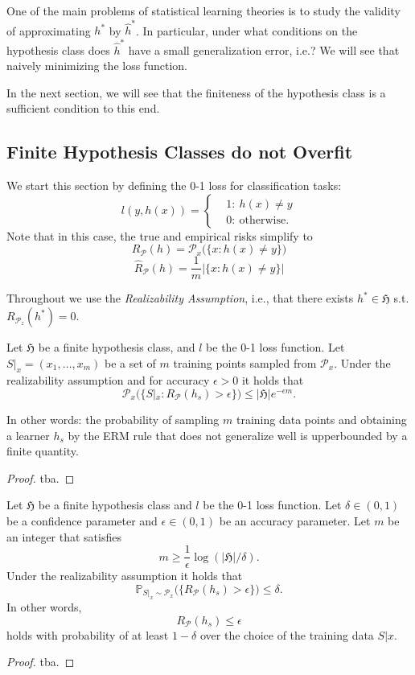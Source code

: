 One of the main problems of statistical learning theories is to study the
validity of approximating $h^*$ by $\hat{h}^*$. In particular, under what
conditions on the hypothesis class does $\hat{h}^*$ have a small generalization error,
i.e.? We
will see that naively minimizing the loss function. 

In the next section, we will see that the finiteness of the hypothesis class is
a sufficient condition to this end. 

\subsection{Finite Hypothesis Classes do not Overfit}
We start this section by defining the 0-1 loss for classification tasks:
\begin{equation*}
    l(y, h(x)) =
    \begin{cases}
         & 1: \ h(x) \neq y \\
        & 0: \ \text{otherwise}.
    \end{cases}	
\end{equation*}
Note that in this case, the true and empirical risks simplify to
$$
R_{\mathcal{P}}(h) = \mathcal{P}_x \bigl(\{x: h(x) \neq y\} \bigr)
$$
$$
\hat{R}_{\mathcal{P}}(h) = \frac{1}{m} | \{x: h(x) \neq y\} |
$$

Throughout we use the 
 \emph{Realizability Assumption}, i.e., that
there exists $h^* \in \mathfrak{H}$ s.t. $R_{\mathcal{P}_z}(h^*) = 0$.

    \begin{lemma}
		Let $\mathfrak{H}$ be a finite hypothesis class, and $l$ be the 0-1 loss
		function. Let $S|_x = (x_1, \dots, x_m)$ be a set of $m$ training points
		sampled from $\mathcal{P}_x$. Under the realizability assumption and
		for accuracy $\epsilon >0$ it holds that 
		$$
		\mathcal{P}_x\bigl(\{S|_x: R_\mathcal{P}(h_s) > \epsilon\} \bigr) \leq |\mathfrak{H}| e ^{-\epsilon m}.
		$$
	\end{lemma}
	In other words: the probability of sampling $m$ training data points and
	obtaining a learner $h_s$ by the ERM rule that does not generalize well is
	upperbounded by a finite quantity.
\begin{proof}
    tba.
\end{proof}
    \begin{coro}
		\label{Coro:finite_hypo}
		Let $\mathfrak{H}$ be a finite hypothesis class and $l$ be the 0-1 loss
		function. Let $\delta \in (0,1)$ be a confidence parameter and $\epsilon \in
		(0,1)$ be an accuracy parameter. Let $m$ be an integer that satisfies
		$$
		m \geq \frac{1}{\epsilon} \log(|\mathfrak{H}|/\delta).
		$$ 	
		Under the realizability assumption it holds that 
		$$
		\mathbb{P}_{S|_x \sim \mathcal{P}_x} \bigl( \{ R_\mathcal{P}(h_s) > \epsilon \}\bigr) \leq \delta.
		$$
		In other words, 
		$$
		R_\mathcal{P}(h_s) \leq \epsilon
		$$
		holds with probability of at least $1-\delta$ over the choice of the
		training data $S|x$.
	\end{coro}
    \begin{proof}
        tba.
    \end{proof}
